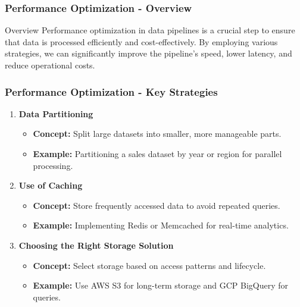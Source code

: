 \documentclass[aspectratio=169]{beamer}
\begin{document}
\begin{frame}[fragile]
    \frametitle{Performance Optimization - Overview}
    \begin{block}{Overview}
        Performance optimization in data pipelines is a crucial step to ensure that data is processed efficiently and cost-effectively. 
        By employing various strategies, we can significantly improve the pipeline's speed, lower latency, and reduce operational costs.
    \end{block}
\end{frame}

\begin{frame}[fragile]
    \frametitle{Performance Optimization - Key Strategies}
    \begin{enumerate}
        \item \textbf{Data Partitioning}
            \begin{itemize}
                \item \textbf{Concept:} Split large datasets into smaller, more manageable parts.
                \item \textbf{Example:} Partitioning a sales dataset by year or region for parallel processing.
            \end{itemize}
        \item \textbf{Use of Caching}
            \begin{itemize}
                \item \textbf{Concept:} Store frequently accessed data to avoid repeated queries.
                \item \textbf{Example:} Implementing Redis or Memcached for real-time analytics.
            \end{itemize}
        \item \textbf{Choosing the Right Storage Solution}
            \begin{itemize}
                \item \textbf{Concept:} Select storage based on access patterns and lifecycle.
                \item \textbf{Example:} Use AWS S3 for long-term storage and GCP BigQuery for queries.
            \end{itemize}
    \end{enumerate}
\end{frame}
\end{document}
